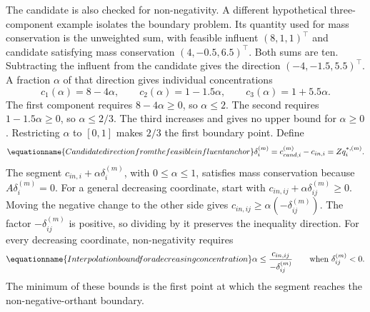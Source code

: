 The candidate is also checked for non-negativity. A different hypothetical three-component example isolates the boundary problem. Its quantity used for mass conservation is the unweighted sum, with feasible influent $(8,1,1)^\top$ and candidate satisfying mass conservation $(4,-0.5,6.5)^\top$. Both sums are ten. Subtracting the influent from the candidate gives the direction $(-4,-1.5,5.5)^\top$. A fraction $\alpha$ of that direction gives individual concentrations
\[
c_1(\alpha)=8-4\alpha,\qquad
c_2(\alpha)=1-1.5\alpha,\qquad
c_3(\alpha)=1+5.5\alpha.
\]
The first component requires $8-4\alpha\geq0$, so $\alpha\leq2$. The second requires $1-1.5\alpha\geq0$, so $\alpha\leq2/3$. The third increases and gives no upper bound for $\alpha\geq0$. Restricting $\alpha$ to $[0,1]$ makes $2/3$ the first boundary point. Define
\begin{equation}
\equationname{Candidate direction from the feasible influent anchor}
\delta_i^{(m)}=c_{cand,i}^{(m)}-c_{in,i}=Zq_i^{*,(m)}.
\label{eq:projection_candidate_direction}
\end{equation}
The segment $c_{in,i}+\alpha\delta_i^{(m)}$, with $0\leq\alpha\leq1$, satisfies mass conservation because $A\delta_i^{(m)}=0$. For a general decreasing coordinate, start with $c_{in,ij}+\alpha\delta_{ij}^{(m)}\geq0$. Moving the negative change to the other side gives $c_{in,ij}\geq\alpha(-\delta_{ij}^{(m)})$. The factor $-\delta_{ij}^{(m)}$ is positive, so dividing by it preserves the inequality direction. For every decreasing coordinate, non-negativity requires
\begin{equation}
\equationname{Interpolation bound for a decreasing concentration}
\alpha\leq\frac{c_{in,ij}}{-\delta_{ij}^{(m)}}
\qquad\text{when }\delta_{ij}^{(m)}<0.
\label{eq:projection_coordinate_bound}
\end{equation}
The minimum of these bounds is the first point at which the segment reaches the non-negative-orthant boundary.

